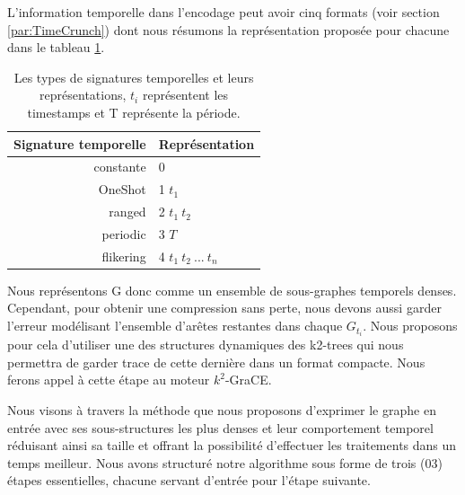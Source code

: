 			
L'information temporelle dans l'encodage peut avoir cinq formats (voir section \ref{par:TimeCrunch}) dont nous résumons la représentation proposée pour chacune dans le tableau \ref{tab:signtmp}.  
			
			\begin{table}[h]
			
			\begin{center}
			\begin{tabular}{|r|l|}
			\hline Signature temporelle & Représentation	
			\\\hline constante & 0	
			
			\\\hline OneShot & 1 $t_{1}$	
			
			\\\hline ranged & 2	$t_{1}\ t_{2}$	
			
			\\\hline periodic & 3  $T$	
			
			\\\hline flikering & 4 $t_{1}\ t_{2}\ ...\ t_{n}$	
			
			\\\hline			
			\end{tabular}
			\end{center}
			
			 \caption{\small {Les types de signatures temporelles et leurs représentations, $t_{i}$	 représentent les timestamps et T représente la période.}}
				\label{tab:signtmp}			
			\end{table}
			
			Nous représentons G donc comme un ensemble de sous-graphes temporels denses. Cependant, pour obtenir une compression sans perte, nous devons aussi garder l'erreur modélisant l'ensemble d'arêtes restantes dans chaque $G_{t_{i}}$. Nous proposons pour cela d'utiliser une des structures dynamiques des k2-trees qui nous permettra de garder trace de cette dernière dans un format compacte. Nous ferons appel à cette étape au moteur $k^2$-GraCE.
			
			 Nous visons à travers la méthode que nous proposons d'exprimer le graphe en entrée avec ses sous-structures les plus denses et leur comportement temporel réduisant ainsi sa taille et offrant la possibilité d'effectuer les traitements dans un temps meilleur. Nous avons structuré notre algorithme sous forme de trois (03) étapes essentielles, chacune servant d'entrée pour l'étape suivante.
			 
